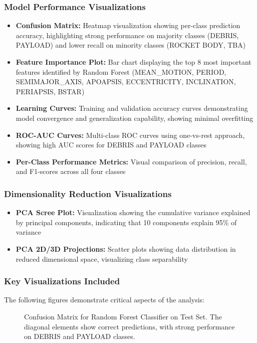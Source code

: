 \documentclass[12pt,a4paper]{article}
\begin{document}
\subsubsection{Model Performance Visualizations}
\begin{itemize}
    \item \textbf{Confusion Matrix:} Heatmap visualization showing per-class prediction accuracy, highlighting strong performance on majority classes (DEBRIS, PAYLOAD) and lower recall on minority classes (ROCKET BODY, TBA)
    \item \textbf{Feature Importance Plot:} Bar chart displaying the top 8 most important features identified by Random Forest (MEAN\_MOTION, PERIOD, SEMIMAJOR\_AXIS, APOAPSIS, ECCENTRICITY, INCLINATION, PERIAPSIS, BSTAR)
    \item \textbf{Learning Curves:} Training and validation accuracy curves demonstrating model convergence and generalization capability, showing minimal overfitting
    \item \textbf{ROC-AUC Curves:} Multi-class ROC curves using one-vs-rest approach, showing high AUC scores for DEBRIS and PAYLOAD classes
    \item \textbf{Per-Class Performance Metrics:} Visual comparison of precision, recall, and F1-scores across all four classes
\end{itemize}

\subsubsection{Dimensionality Reduction Visualizations}
\begin{itemize}
    \item \textbf{PCA Scree Plot:} Visualization showing the cumulative variance explained by principal components, indicating that 10 components explain 95\% of variance
    \item \textbf{PCA 2D/3D Projections:} Scatter plots showing data distribution in reduced dimensional space, visualizing class separability
\end{itemize}

\subsubsection{Key Visualizations Included}
The following figures demonstrate critical aspects of the analysis:

\begin{figure}[H]
\centering
\caption{Confusion Matrix for Random Forest Classifier on Test Set. The diagonal elements show correct predictions, with strong performance on DEBRIS and PAYLOAD classes.}
\label{fig:confusion_matrix}
\end{figure}
\end{document}
